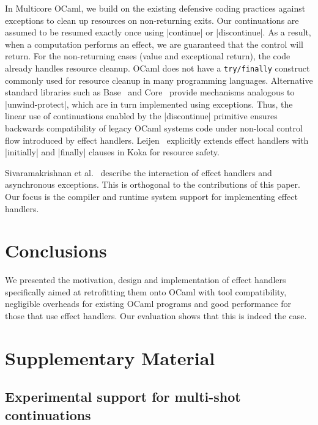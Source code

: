 \documentclass[sigplan,10pt,review,anonymous]{acmart}\settopmatter{printfolios=true,printccs=false,printacmref=false}
\begin{document}
In Multicore OCaml, we build on the existing defensive coding practices against
exceptions to clean up resources on non-returning exits. Our continuations are
assumed to be resumed exactly once using |continue| or |discontinue|. As a
result, when a computation performs an effect, we are guaranteed that the
control will return. For the non-returning cases (value and exceptional
return), the code already handles resource cleanup. OCaml does not have a
\texttt{\footnotesize try/finally} construct commonly used for resource cleanup
in many programming languages. Alternative standard libraries such as
Base~\cite{BaseProtect} and Core~\cite{CoreProtect} provide mechanisms
analogous to |unwind-protect|, which are in turn implemented using exceptions.
Thus, the linear use of continuations enabled by the |discontinue| primitive
ensures backwards compatibility of legacy OCaml systems code under non-local
control flow introduced by effect handlers. Leijen~\cite{Leijen18} explicitly
extends effect handlers with |initially| and |finally| clauses in Koka for
resource safety.

Sivaramakrishnan et al.~\cite{TFP17} describe the interaction of effect
handlers and asynchronous exceptions. This is orthogonal to the contributions
of this paper. Our focus is the compiler and runtime system support for
implementing effect handlers.

\section{Conclusions}
\label{sec:conc}

We presented the motivation, design and implementation of effect handlers
specifically aimed at retrofitting them onto OCaml with tool compatibility,
negligible overheads for existing OCaml programs and good performance for those
that use effect handlers. Our evaluation shows that this is indeed the case.

\clearpage




\clearpage

\section*{Supplementary Material}
\setcounter{figure}{0}

\subsection*{Experimental support for multi-shot continuations}
\end{document}
